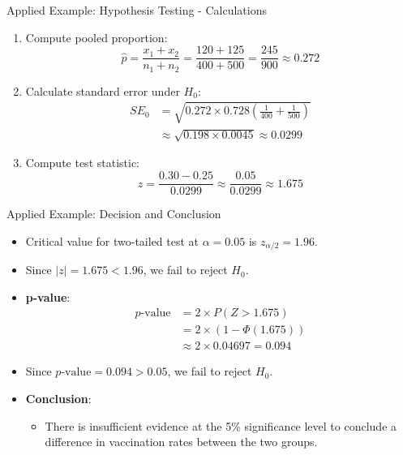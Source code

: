 \documentclass[handout]{beamer} %
\begin{document}
\begin{frame}{Applied Example: Hypothesis Testing - Calculations}
  \begin{enumerate}
    \item Compute pooled proportion:
    \[
    \hat{p} = \frac{x_1 + x_2}{n_1 + n_2} = \frac{120 + 125}{400 + 500} = \frac{245}{900} \approx 0.272
    \]
    \item Calculate standard error under $H_0$:
    \begin{align*}
        SE_0 &= \sqrt{0.272 \times 0.728 \left( \frac{1}{400} + \frac{1}{500} \right)} \\
        & \approx  \sqrt{0.198 \times 0.0045} \approx 0.0299
    \end{align*}

    \item Compute test statistic:
    \[
    z = \frac{0.30 - 0.25}{0.0299} \approx \frac{0.05}{0.0299} \approx 1.675
    \]
  \end{enumerate}
\end{frame}

\begin{frame}{Applied Example: Decision and Conclusion}
  \begin{itemize}
    \item Critical value for two-tailed test at $\alpha = 0.05$ is $z_{\alpha/2} = 1.96$.
    \item Since $|z| = 1.675 < 1.96$, we fail to reject $H_0$.
    \item \textbf{p-value}:
    \begin{align*}
         p\text{-value} &= 2 \times P(Z > 1.675)  \\
            &= 2 \times (1 - \Phi(1.675)) \\
            & \approx 2 \times 0.04697 = 0.094
    \end{align*}

    \item Since $p\text{-value} = 0.094 > 0.05$, we fail to reject $H_0$.
    \item \textbf{Conclusion}:
      \begin{itemize}
        \item There is insufficient evidence at the 5\% significance level to conclude a difference in vaccination rates between the two groups.
      \end{itemize}
  \end{itemize}
\end{frame}
\end{document}
